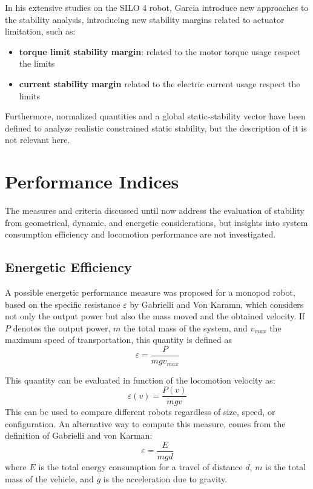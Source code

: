 In his extensive studies on the SILO 4 robot\cite{QuadrupedLocomotion}, Garcia introduce new approaches to the stability analysis, introducing new stability margins related to actuator limitation, such as: 
\begin{itemize}
    \setlength\itemsep{-0.7em} 
    \item \textbf{ torque limit stability margin}: related to the motor torque usage respect the limits
     \item \textbf{ current stability margin} related to the electric current usage respect the limits
\end{itemize}
Furthermore, normalized quantities and a global static-stability vector have been defined to analyze realistic constrained static stability, but the description of it is not relevant here.

\section{Performance Indices}
\label{sec:dynamic_indices}

The measures and criteria discussed until now address the evaluation of stability from geometrical, dynamic, and energetic considerations, but insights into system consumption efficiency and locomotion performance are not investigated. 

\subsection{Energetic Efficiency}
\label{sec:energetic_efficecny}

A possible energetic performance measure was proposed for a monopod robot\cite{SpecificResistance2}, based on the specific resistance $\varepsilon$ by Gabrielli and Von Karamn\cite{SpecificResistance1}, which considers not only the output power but also the mass moved and the obtained velocity. 
If $P$ denotes the output power, $m$ the total mass of the system, and $v_{max}$ the maximum speed of transportation, this quantity is defined as 
\begin{equation}
\label{eq:NESM}
    \varepsilon = \frac{P}{mgv_{max}}  
\end{equation}

This quantity can be evaluated in function of the locomotion  velocity as: 
\begin{equation}
\label{eq:NESM_2}
    \varepsilon(v) = \frac{P(v)}{mgv}  
\end{equation}
This can be used to compare different robots regardless of size, speed, or configuration.
An alternative way to compute this measure, comes from the definition of Gabrielli and von Karman\cite{SpecificResistance1}: 
\begin{equation}
\label{eq:NESM_2}
    \varepsilon = \frac{E}{mgd}  
\end{equation}
where $E$ is the total energy consumption for a travel of
distance $d$, $m$ is the total mass of the vehicle, and $g$ is
the acceleration due to gravity\cite{HandbookLegged}.

